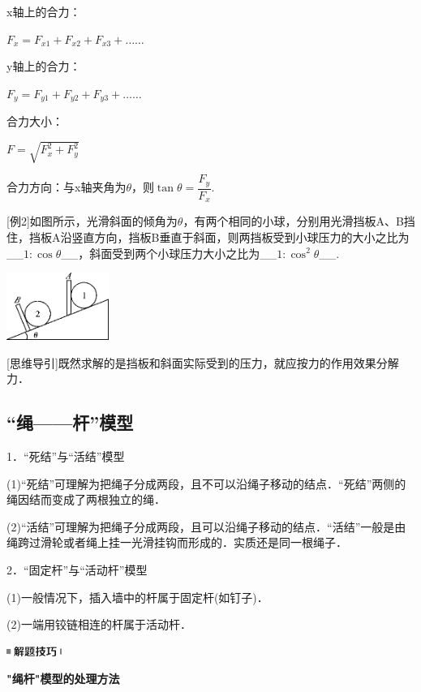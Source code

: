 x轴上的合力：

$F_x=F_{x1}+F_{x2}+F_{x3}+\ldots\ldots{}$

y轴上的合力：

$F_y=F_{y1}+F_{y2}+F_{y3}+\ldots\ldots{}$

合力大小：

$F=\sqrt{F_x^2+F_y^2}$

合力方向：与x轴夹角为$\theta$，则$\tan \theta=\dfrac{F_y}{F_x}$.

{[}例2{]}如图所示，光滑斜面的倾角为$\theta$，有两个相同的小球，分别用光滑挡板A、B挡住，挡板A沿竖直方向，挡板B垂直于斜面，则两挡板受到小球压力的大小之比为\_\_$1:\cos\theta$\_\_，斜面受到两个小球压力大小之比为\_\_$1:\cos^2\theta$\_\_.

\begin{center}\includegraphics[width=1.3125in,height=0.86458in]{media/image73.png}\end{center}

{[}思维导引{]}既然求解的是挡板和斜面实际受到的压力，就应按力的作用效果分解力．

\subsection{``绳------杆''模型}

1．``死结''与``活结''模型

(1)``死结''可理解为把绳子分成两段，且不可以沿绳子移动的结点．``死结''两侧的绳因结而变成了两根独立的绳．

(2)``活结''可理解为把绳子分成两段，且可以沿绳子移动的结点．``活结''一般是由绳跨过滑轮或者绳上挂一光滑挂钩而形成的．实质还是同一根绳子．

2．``固定杆''与``活动杆''模型

(1)一般情况下，插入墙中的杆属于固定杆(如钉子)．

(2)一端用铰链相连的杆属于活动杆．

\begin{center}\includegraphics[width=0.70833in,height=0.125in]{media/image37.png}\end{center}

\begin{center}
	\textbf{"绳杆"模型的处理方法}
\end{center}


